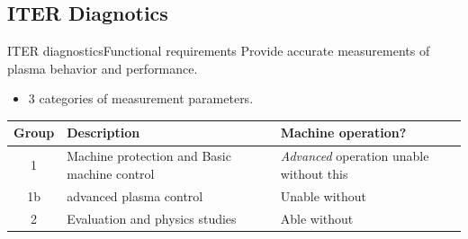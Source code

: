 \documentclass{beamer}
\begin{document}
\subsection{ITER Diagnotics}
\begin{frame}{ITER diagnostics}{Functional requirements}
		Provide accurate measurements of plasma behavior and performance.

  	\begin{itemize}
		\item  3 categories of measurement parameters.
	\end{itemize}	 		
	\begin{tabular}{|c|p{4 cm}|p{4 cm}|}
		\hline
		\textbf {Group}& \textbf {Description} & \textbf {Machine operation? }\\\hline
		1 & Machine protection and Basic machine control & \textit{Advanced} operation unable  without  this\\\hline
		1b & advanced plasma control & Unable  without  \\\hline
		2& Evaluation and physics studies & Able  without  \\\hline
	\end{tabular}	
\end{frame}
\end{document}
